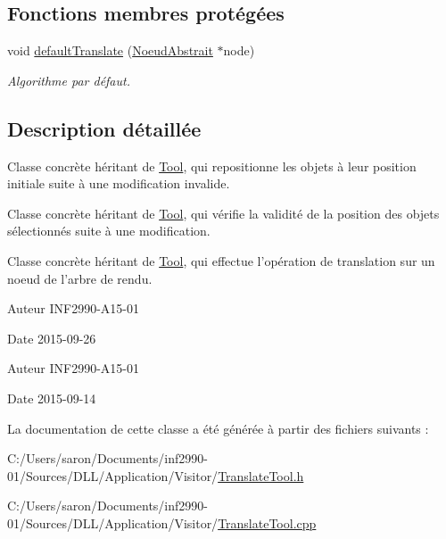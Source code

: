 \subsection*{Fonctions membres protégées}
\begin{DoxyCompactItemize}
\item 
void \hyperlink{group__inf2990_ga1e47597de16ebba1986441232607d6dc}{default\-Translate} (\hyperlink{class_noeud_abstrait}{Noeud\-Abstrait} $\ast$node)
\begin{DoxyCompactList}\small\item\em Algorithme par défaut. \end{DoxyCompactList}\end{DoxyCompactItemize}


\subsection{Description détaillée}
Classe concrète héritant de \hyperlink{class_tool}{Tool}, qui repositionne les objets à leur position initiale suite à une modification invalide. 

Classe concrète héritant de \hyperlink{class_tool}{Tool}, qui vérifie la validité de la position des objets sélectionnés suite à une modification.

Classe concrète héritant de \hyperlink{class_tool}{Tool}, qui effectue l'opération de translation sur un noeud de l'arbre de rendu.

\begin{DoxyAuthor}{Auteur}
I\-N\-F2990-\/\-A15-\/01 
\end{DoxyAuthor}
\begin{DoxyDate}{Date}
2015-\/09-\/26
\end{DoxyDate}
\begin{DoxyAuthor}{Auteur}
I\-N\-F2990-\/\-A15-\/01 
\end{DoxyAuthor}
\begin{DoxyDate}{Date}
2015-\/09-\/14 
\end{DoxyDate}


La documentation de cette classe a été générée à partir des fichiers suivants \-:\begin{DoxyCompactItemize}
\item 
C\-:/\-Users/saron/\-Documents/inf2990-\/01/\-Sources/\-D\-L\-L/\-Application/\-Visitor/\hyperlink{_translate_tool_8h}{Translate\-Tool.\-h}\item 
C\-:/\-Users/saron/\-Documents/inf2990-\/01/\-Sources/\-D\-L\-L/\-Application/\-Visitor/\hyperlink{_translate_tool_8cpp}{Translate\-Tool.\-cpp}\end{DoxyCompactItemize}
